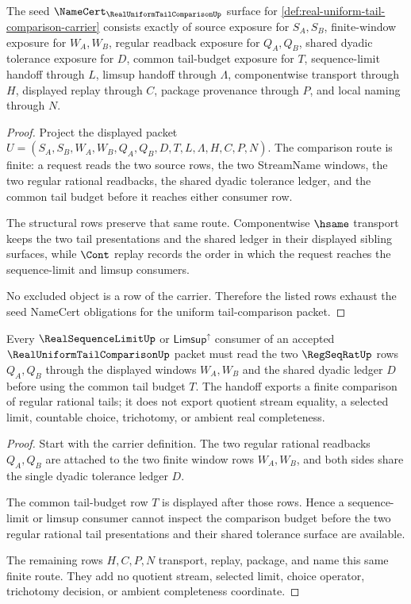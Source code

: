 \begin{theorem}
\label{thm:real-uniform-tail-comparison-namecert-obligations}
The seed $\NameCert_{\RealUniformTailComparisonUp}$ surface for \autoref{def:real-uniform-tail-comparison-carrier} consists exactly of source exposure for $S_A,S_B$, finite-window exposure for $W_A,W_B$, regular readback exposure for $Q_A,Q_B$, shared dyadic tolerance exposure for $D$, common tail-budget exposure for $T$, sequence-limit handoff through $L$, limsup handoff through $\Lambda$, componentwise transport through $H$, displayed replay through $C$, package provenance through $P$, and local naming through $N$.
\end{theorem}
\begin{proof}
Project the displayed packet $U=(S_A,S_B,W_A,W_B,Q_A,Q_B,D,T,L,\Lambda,H,C,P,N)$. The comparison route is finite: a request reads the two source rows, the two StreamName windows, the two regular rational readbacks, the shared dyadic tolerance ledger, and the common tail budget before it reaches either consumer row.

The structural rows preserve that same route. Componentwise $\hsame$ transport keeps the two tail presentations and the shared ledger in their displayed sibling surfaces, while $\Cont$ replay records the order in which the request reaches the sequence-limit and limsup consumers.

No excluded object is a row of the carrier. Therefore the listed rows exhaust the seed NameCert obligations for the uniform tail-comparison packet.
\end{proof}

\begin{theorem}
\label{thm:real-uniform-tail-comparison-regseqrat-handoff}
Every $\RealSequenceLimitUp$ or $\mathsf{Limsup}^{\uparrow}$ consumer of an accepted $\RealUniformTailComparisonUp$ packet must read the two $\RegSeqRatUp$ rows $Q_A,Q_B$ through the displayed windows $W_A,W_B$ and the shared dyadic ledger $D$ before using the common tail budget $T$. The handoff exports a finite comparison of regular rational tails; it does not export quotient stream equality, a selected limit, countable choice, trichotomy, or ambient real completeness.
\end{theorem}
\begin{proof}
Start with the carrier definition. The two regular rational readbacks $Q_A,Q_B$ are attached to the two finite window rows $W_A,W_B$, and both sides share the single dyadic tolerance ledger $D$.

The common tail-budget row $T$ is displayed after those rows. Hence a sequence-limit or limsup consumer cannot inspect the comparison budget before the two regular rational tail presentations and their shared tolerance surface are available.

The remaining rows $H,C,P,N$ transport, replay, package, and name this same finite route. They add no quotient stream, selected limit, choice operator, trichotomy decision, or ambient completeness coordinate.
\end{proof}

